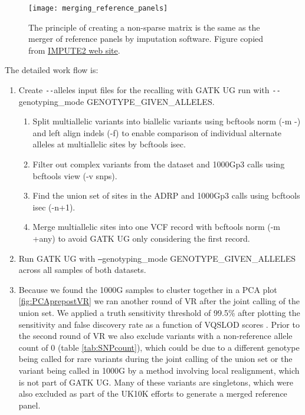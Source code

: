 \begin{figure}[htbp]
\centering
\texttt{[image: merging\_reference\_panels]}
\caption{The principle of creating a non-sparse matrix is the same as the merger of reference panels by imputation software. Figure copied from \href{http://mathgen.stats.ox.ac.uk/impute/merging\_reference\_panels.png}{IMPUTE2 web site}.}
\label{fig:merging_reference_panels}
\end{figure}

The detailed work flow is:
\begin{enumerate}
\item{Create \texttt{-{}-}alleles input files for the recalling with \gls{GATK} \gls{UG} run with \texttt{-{}-}genotyping\_mode GENOTYPE\_GIVEN\_ALLELES.}

\begin{enumerate}

\item{Split multiallelic variants into biallelic variants using bcftools norm (-m -) and left align indels (-f) to enable comparison of individual alternate alleles at multiallelic sites by bcftools isec.}

\item{Filter out complex variants from the dataset and 1000Gp3 calls using bcftools view (-v snps).}

\item{Find the union set of sites in the ADRP and 1000Gp3 calls using bcftools isec (-n+1).}

\item{Merge multiallelic sites into one VCF record with bcftools norm (-m +any) to avoid GATK UG only considering the first record.}

\end{enumerate}

\item{Run \gls{GATK} \gls{UG} with \texttt{--}genotyping\_mode GENOTYPE\_GIVEN\_ALLELES across all samples of both datasets.}

\item{Because we found the 1000G samples to cluster together in a PCA plot \ref{fig:PCAprepostVR} we ran another round of \gls{VR} after the joint calling of the union set. We applied a truth sensitivity threshold of 99.5\% after plotting the sensitivity and false discovery rate as a function of VQSLOD scores
. Prior to the second round of \gls{VR} we also exclude variants with a non-reference allele count of 0 (table \ref{tab:SNPcount}), which could be due to a different genotype being called for rare variants during the joint calling of the union set or the variant being called in 1000G by a method involving local realignment, which is not part of \gls{GATK} \gls{UG}. Many of these variants are singletons, which were also excluded as part of the UK10K efforts to generate a merged reference panel.\cite{2015Huang}}


\end{enumerate}
